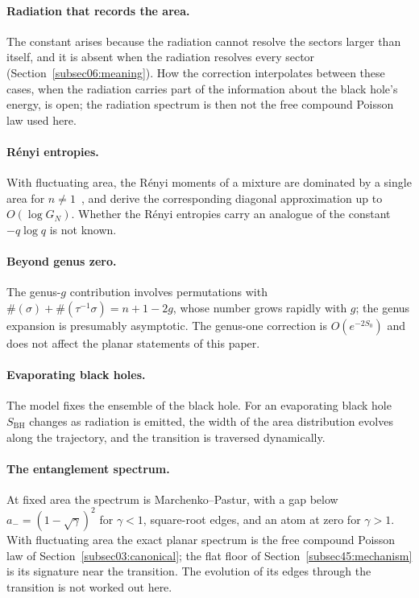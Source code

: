 \documentclass[11pt,letterpaper]{article}
\theoremstyle{plain}
\theoremstyle{definition}
\theoremstyle{remark}
\begin{document}
\paragraph{Radiation that records the area.} The constant arises because the radiation cannot resolve the sectors larger than itself, and it is absent when the radiation resolves every sector (Section~\ref{subsec06:meaning}). How the correction interpolates between these cases, when the radiation carries part of the information about the black hole's energy, is open; the radiation spectrum is then not the free compound Poisson law used here.


\paragraph{R\'enyi entropies.} With fluctuating area, the R\'enyi moments of a mixture are dominated by a single area for $n \neq 1$~\citep{marolfwangwang2020, dongwang2020}, and \citet{peningtonrath2025} derive the corresponding diagonal approximation up to $O(\log G_N)$. Whether the R\'enyi entropies carry an analogue of the constant $-q\log q$ is not known.

\paragraph{Beyond genus zero.} The genus-$g$ contribution involves permutations with $\#(\sigma) + \#(\tau^{-1}\sigma) = n + 1 - 2g$, whose number grows rapidly with $g$; the genus expansion is presumably asymptotic. The genus-one correction is $O(e^{-2S_0})$ and does not affect the planar statements of this paper.

\paragraph{Evaporating black holes.} The model fixes the ensemble of the black hole. For an evaporating black hole $S_{\mathrm{BH}}$ changes as radiation is emitted, the width of the area distribution evolves along the trajectory, and the transition is traversed dynamically.

\paragraph{The entanglement spectrum.} At fixed area the spectrum is Marchenko--Pastur, with a gap below $a_- = (1 - \sqrt{\gamma})^2$ for $\gamma < 1$, square-root edges, and an atom at zero for $\gamma > 1$. With fluctuating area the exact planar spectrum is the free compound Poisson law of Section~\ref{subsec03:canonical}; the flat floor of Section~\ref{subsec45:mechanism} is its signature near the transition. The evolution of its edges through the transition is not worked out here.
\end{document}
